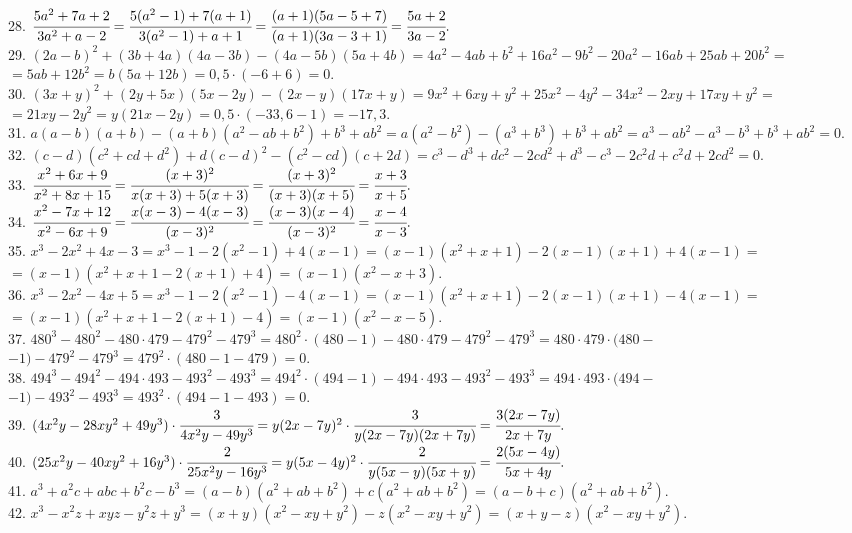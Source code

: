 28. $\cfrac{5a^2+7a+2}{3a^2+a-2}=\cfrac{5(a^2-1)+7(a+1)}{3(a^2-1)+a+1}=
\cfrac{(a+1)(5a-5+7)}{(a+1)(3a-3+1)}=\cfrac{5a+2}{3a-2}.$\\
29. $(2a-b)^2+(3b+4a)(4a-3b)-(4a-5b)(5a+4b)=4a^2-4ab+b^2+16a^2-9b^2-20a^2-16ab+25ab+20b^2=$\\$=5ab+12b^2=b(5a+12b)=0,5\cdot(-6+6)=0.$\\
30. $(3x+y)^2+(2y+5x)(5x-2y)-(2x-y)(17x+y)=9x^2+6xy+y^2+25x^2-4y^2-34x^2-2xy+17xy+y^2=$\\$=21xy-2y^2=y(21x-2y)=0,5\cdot(-33,6-1)=-17,3.$\\
31. $a(a-b)(a+b)-(a+b)(a^2-ab+b^2)+b^3+ab^2=a(a^2-b^2)-(a^3+b^3)+b^3+ab^2=a^3-ab^2-a^3-b^3+b^3+ab^2=0.$\\
32. $(c-d)(c^2+cd+d^2)+d(c-d)^2-(c^2-cd)(c+2d)=c^3-d^3+dc^2-2cd^2+d^3-c^3-2c^2d+c^2d+2cd^2=0.$\\
33. $\cfrac{x^2+6x+9}{x^2+8x+15}=\cfrac{(x+3)^2}{x(x+3)+5(x+3)}=\cfrac{(x+3)^2}{(x+3)(x+5)}=\cfrac{x+3}{x+5}.$\\
34. $\cfrac{x^2-7x+12}{x^2-6x+9}=\cfrac{x(x-3)-4(x-3)}{(x-3)^2}=\cfrac{(x-3)(x-4)}{(x-3)^2}=\cfrac{x-4}{x-3}.$\\
35. $x^3-2x^2+4x-3=x^3-1-2(x^2-1)+4(x-1)=(x-1)(x^2+x+1)-2(x-1)(x+1)+4(x-1)=$\\$=(x-1)(x^2+x+1-2(x+1)+4)=
(x-1)(x^2-x+3).$\\
36. $x^3-2x^2-4x+5=x^3-1-2(x^2-1)-4(x-1)=(x-1)(x^2+x+1)-2(x-1)(x+1)-4(x-1)=$\\$=(x-1)(x^2+x+1-2(x+1)-4)=(x-1)(x^2-x-5).$\\
37. $480^3-480^2-480\cdot479-479^2-479^3=480^2\cdot(480-1)-480\cdot479-479^2-479^3=480\cdot479\cdot(480-$\\$-1)-479^2-479^3=
479^2\cdot(480-1-479)=0.$\\
38. $494^3-494^2-494\cdot493-493^2-493^3=494^2\cdot(494-1)-494\cdot493-493^2-493^3=494\cdot493\cdot(494-$\\$-1)-493^2-493^3=
493^2\cdot(494-1-493)=0.$\\
39. $(4x^2y-28xy^2+49y^3)\cdot\cfrac{3}{4x^2y-49y^3}=y(2x-7y)^2\cdot\cfrac{3}{y(2x-7y)(2x+7y)}=\cfrac{3(2x-7y)}{2x+7y}.$\\
40. $(25x^2y-40xy^2+16y^3)\cdot\cfrac{2}{25x^2y-16y^3}=y(5x-4y)^2\cdot\cfrac{2}{y(5x-y)(5x+y)}=\cfrac{2(5x-4y)}{5x+4y}.$\\
41. $a^3+a^2c+abc+b^2c-b^3=(a-b)(a^2+ab+b^2)+c(a^2+ab+b^2)=(a-b+c)(a^2+ab+b^2).$\\
42. $x^3-x^2z+xyz-y^2z+y^3=(x+y)(x^2-xy+y^2)-z(x^2-xy+y^2)=(x+y-z)(x^2-xy+y^2).$\\

